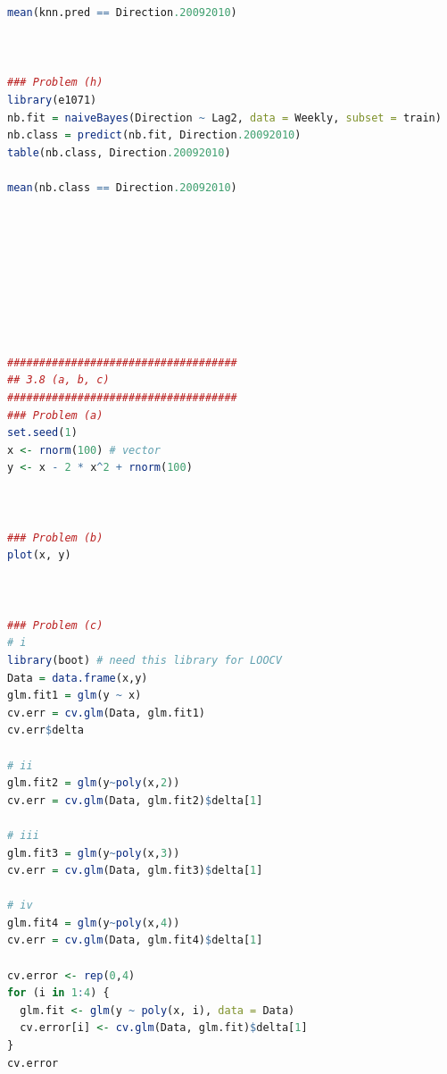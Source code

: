 \documentclass{article}
\begin{document}
\begin{lstlisting}[language=R]
mean(knn.pred == Direction.20092010)



### Problem (h)
library(e1071)
nb.fit = naiveBayes(Direction ~ Lag2, data = Weekly, subset = train)
nb.class = predict(nb.fit, Direction.20092010)
table(nb.class, Direction.20092010)

mean(nb.class == Direction.20092010)









####################################
## 3.8 (a, b, c)
####################################
### Problem (a)
set.seed(1)
x <- rnorm(100) # vector
y <- x - 2 * x^2 + rnorm(100)



### Problem (b)
plot(x, y)



### Problem (c)
# i
library(boot) # need this library for LOOCV
Data = data.frame(x,y)
glm.fit1 = glm(y ~ x)
cv.err = cv.glm(Data, glm.fit1)
cv.err$delta

# ii
glm.fit2 = glm(y~poly(x,2))
cv.err = cv.glm(Data, glm.fit2)$delta[1]

# iii
glm.fit3 = glm(y~poly(x,3))
cv.err = cv.glm(Data, glm.fit3)$delta[1]

# iv
glm.fit4 = glm(y~poly(x,4))
cv.err = cv.glm(Data, glm.fit4)$delta[1]

cv.error <- rep(0,4)
for (i in 1:4) {
  glm.fit <- glm(y ~ poly(x, i), data = Data)
  cv.error[i] <- cv.glm(Data, glm.fit)$delta[1]
}
cv.error
\end{lstlisting}
\end{document}
